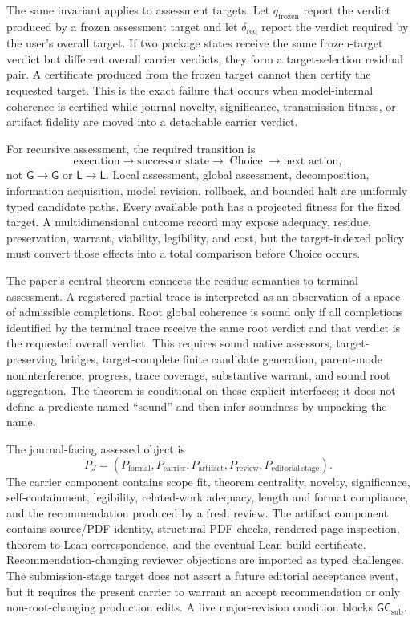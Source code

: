 \documentclass[10pt]{article}
\newcommand{\Choice}{\operatorname{Choice}}
\newcommand{\Loc}{\mathsf L}
\newcommand{\Glob}{\mathsf G}
\newcommand{\GCsub}{\mathsf{GC}_{\mathrm{sub}}}
\begin{document}
The same invariant applies to assessment targets.  Let $q_{\mathrm{frozen}}$ report the verdict produced by a frozen assessment target and let $\delta_{\mathrm{req}}$ report the verdict required by the user's overall target.  If two package states receive the same frozen-target verdict but different overall carrier verdicts, they form a target-selection residual pair.  A certificate produced from the frozen target cannot then certify the requested target.  This is the exact failure that occurs when model-internal coherence is certified while journal novelty, significance, transmission fitness, or artifact fidelity are moved into a detachable carrier verdict.

For recursive assessment, the required transition is
\[
  \text{execution}\longrightarrow\text{successor state}
  \longrightarrow\Choice\longrightarrow\text{next action},
\]
not $\Glob\to\Glob$ or $\Loc\to\Loc$.  Local assessment, global assessment, decomposition, information acquisition, model revision, rollback, and bounded halt are uniformly typed candidate paths.  Every available path has a projected fitness for the fixed target.  A multidimensional outcome record may expose adequacy, residue, preservation, warrant, viability, legibility, and cost, but the target-indexed policy must convert those effects into a total comparison before Choice occurs.

The paper's central theorem connects the residue semantics to terminal assessment.  A registered partial trace is interpreted as an observation of a space of admissible completions.  Root global coherence is sound only if all completions identified by the terminal trace receive the same root verdict and that verdict is the requested overall verdict.  This requires sound native assessors, target-preserving bridges, target-complete finite candidate generation, parent-mode noninterference, progress, trace coverage, substantive warrant, and sound root aggregation.  The theorem is conditional on these explicit interfaces; it does not define a predicate named ``sound'' and then infer soundness by unpacking the name.

The journal-facing assessed object is
\[
  P_J=(P_{\mathrm{formal}},P_{\mathrm{carrier}},P_{\mathrm{artifact}},
  P_{\mathrm{review}},P_{\mathrm{editorial\ stage}}).
\]
The carrier component contains scope fit, theorem centrality, novelty, significance, self-containment, legibility, related-work adequacy, length and format compliance, and the recommendation produced by a fresh review.  The artifact component contains source/PDF identity, structural PDF checks, rendered-page inspection, theorem-to-Lean correspondence, and the eventual Lean build certificate.  Recommendation-changing reviewer objections are imported as typed challenges.  The submission-stage target does not assert a future editorial acceptance event, but it requires the present carrier to warrant an accept recommendation or only non-root-changing production edits.  A live major-revision condition blocks $\GCsub$.
\end{document}
